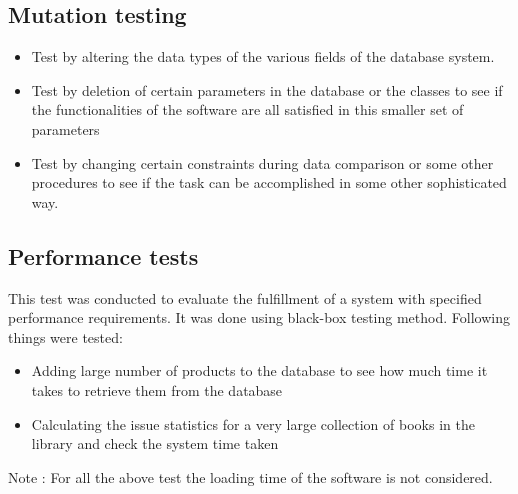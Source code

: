 \documentclass{article}
\begin{document}
\subsection{Mutation testing}
\begin{itemize}
	\item Test by altering the data types of the various fields of the database system.
	\item Test by deletion of certain parameters in the database or the classes to see if the functionalities of the software are all satisfied in this smaller set of parameters
	\item Test by changing certain constraints during data comparison or some other procedures to see if the task can be accomplished in some other sophisticated way.
	
\end{itemize}

\subsection{Performance tests }
This test was conducted to evaluate the fulfillment of a system with specified performance requirements. It
was done using black-box testing method. Following things were tested:\\
\begin{itemize}
	\item Adding large number of products to the database to see how much time it takes to retrieve them from the database
	\item Calculating the issue statistics for a very large collection of books in the library and check the system time taken
	
\end{itemize}

Note : For all the above test the loading time of the software is not considered.
\end{document}
